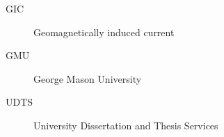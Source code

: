 \vskip 0.25cm
\baselineskip=1pc
\lineskip=1pc
\lineskiplimit=1pc
\begin{description}
  \item[GIC] Geomagnetically induced current
  \item[GMU] George Mason University
  \item[UDTS] University Dissertation and Thesis Services
\end{description}
